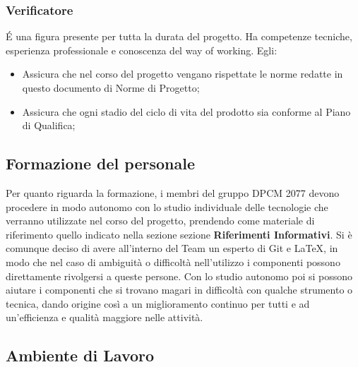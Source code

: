 \subsubsection{Verificatore}
\'E una figura presente per tutta la durata del progetto. Ha competenze tecniche, esperienza professionale e conoscenza del way of working.	
Egli:
\begin{itemize}
\item{Assicura che nel corso del progetto vengano rispettate le norme redatte in questo documento di Norme di Progetto;}
\item{Assicura che ogni stadio del ciclo di vita del prodotto sia conforme al Piano di Qualifica;}
\end{itemize}


\subsection{Formazione del personale}
Per quanto riguarda la formazione, i membri del gruppo DPCM 2077 devono procedere in modo autonomo con lo studio individuale delle tecnologie che verranno utilizzate nel corso del progetto, prendendo come materiale di riferimento quello indicato nella sezione sezione \textbf{Riferimenti Informativi}. Si è comunque deciso di avere all'interno del Team un esperto di Git e {\LaTeX}, in modo che nel caso di ambiguità o difficoltà nell'utilizzo i componenti possono direttamente
rivolgersi a queste persone. Con lo studio autonomo poi si possono aiutare i componenti che si trovano magari in difficoltà con qualche strumento o tecnica, dando origine così a un miglioramento continuo per tutti e ad un'efficienza e qualità maggiore nelle attività. 



\subsection{Ambiente di Lavoro}

